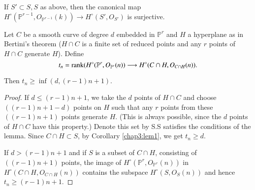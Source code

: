 \begin{Cor}\label{chap3:cor1}
If $S'\subset S,S$ as above, then the canonical map\break $H^\circ
(\mathbb{P}^{r-1},O_{\mathbb{P}^{r-1}}(k))\longrightarrow H^\circ
(S',O_{S'})$ is surjective.
\end{Cor}

\begin{Cor}\label{chap3:cor2}
Let $C$ be a smooth curve of degree $d$ embedded in $\mathbb{P}^r$ and
$H$ a hyperplane as in Bertini's theorem (\ie $H\cap C$ is a finite
set of reduced points and any $r$ points of $H\cap C$ generate
$H$). Define 
$$
t_n=\operatorname{rank} (H^\circ(\mathbb{P}^r, O_{\mathbb{P}^r}(n)) \longrightarrow
H^\circ(C\cap H,O_{C\cap H}(n)).
$$

Then $t_n\geq\inf(d,(r-1)n+1)$. 
\end{Cor}

\begin{proof}
If $d\leq(r-1)n+1$, we take the $d$ points of $H\cap C$ and choose
$((r-1)n+1-d)$ points on $H$ such that any $r$ points from these
$((r-1)n+1)$ points generate $H$. (This is always possible, since the
$d$ points of $H\cap C$ have this property.) Denote this set by S.S
satisfies the conditions of the lemma. Since $C\cap H\subset S$, by
Corollary \ref{chap3:lem1}, we get $t_n\geq d$.

If $d>(r-1)n+1$ and if $S$ is a subset of $C\cap H$, consisting of
$((r-1)n+1)$ points, the image of
$H^\circ(\mathbb{P}^r,O_{\mathbb{P}^r}(n))$ in $H^\circ(C\cap H,
O_{C\cap H}(n))$ contains the subspace $H^\circ(S,O_S(n))$ and hence
$t_n\geq(r-1)n+1$. 
\end{proof}

